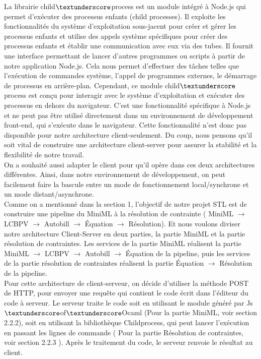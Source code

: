 \documentclass[12pt]{article}
\begin{document}
La librairie child$\textunderscore$process est un module intégré à Node.js qui permet d'exécuter des processus enfants (child processes).  Il exploite les fonctionnalités du système d'exploitation sous-jacent pour créer et gérer les processus enfants et utilise des appels système spécifiques pour créer des processus enfants et établir une communication avec eux via des tubes. Il fournit une interface permettant de lancer d'autres programmes ou scripts à partir de notre application Node.js. Cela nous permet d'effectuer des tâches telles que l'exécution de commandes système, l'appel de programmes externes, le démarrage de processus en arrière-plan. Cependant, ce module child$\textunderscore$process est conçu pour interagir avec le système d'exploitation et exécuter des processus en dehors du navigateur. C’est une fonctionnalité spécifique à Node.js et ne peut pas être utilisé directement dans un environnement de développement front-end, qui s'exécute dans le navigateur. Cette fonctionnalité n'est donc pas disponible pour notre architecture client-seulement. Du coup, nous pensons qu'il soit vital de construire une architecture client-server pour assurer la stabilité et la flexibilité de notre travail.\\

On a souhaité aussi adapter le client pour qu'il opère dans ces deux
architectures différentes. Ainsi, dans notre environnement de
développement, on peut facilement faire la bascule entre un mode de
fonctionnement local/synchrone et un mode distant/asynchrone. \\

Comme on a mentionné dans la section 1, l'objectif de notre projet STL est de construire une pipeline du MiniML à la résolution de contrainte ( MiniML $\rightarrow$ LCBPV $\rightarrow$ Autobill $\rightarrow$ Équation $\rightarrow$ Résolution). Et nous voulons diviser notre architecture Client-Server en deux parties, la partie MiniML et la partie résolution de contraintes. Les services de la partie MiniML réalisent la partie MiniML $\rightarrow$ LCBPV $\rightarrow$ Autobill $\rightarrow$ Équation de la pipeline, puis les services de la partie résolution de contraintes réalisent la partie Équation $\rightarrow$ Résolution de la pipeline.\\

Pour cette architecture de client-serveur, on décide d’utiliser la méthode POST de HTTP, pour envoyer une requête qui contient le code écrit dans l'éditeur du code à serveur. Le serveur traite le code soit en utilisant le module généré par Js$\textunderscore$of$\textunderscore$Ocaml (Pour la partie MiniML, voir section 2.2.2), soit en utilisant la bibliothèque Childprocess, qui peut lancer l'exécution en passant les lignes de commande ( Pour la partie Résolution de contraintes, voir section 2.2.3 ). Après le traitement du code, le serveur renvoie le résultat au client.\\
\end{document}
